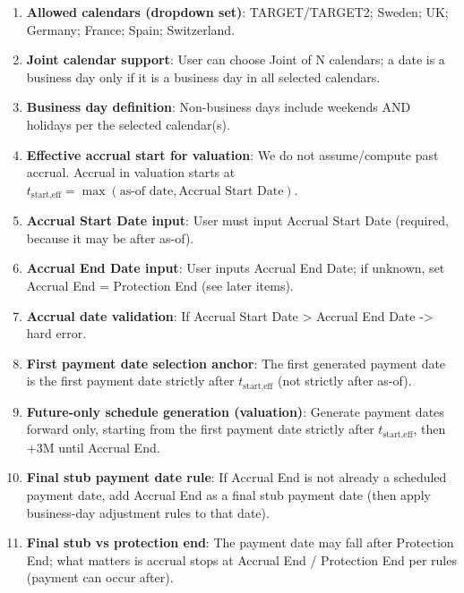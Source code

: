 \documentclass[11pt]{article}
\begin{document}
\begin{enumerate}[label=\arabic*),leftmargin=*,align=left]
\item \textbf{Allowed calendars (dropdown set)}: TARGET/TARGET2; Sweden; UK; Germany; France; Spain; Switzerland.

\item \textbf{Joint calendar support}: User can choose Joint of N calendars; a date is a business day only if it is a business day in all selected calendars.

\item \textbf{Business day definition}: Non-business days include weekends AND holidays per the selected calendar(s).

\item \textbf{Effective accrual start for valuation}: We do not assume/compute past accrual. Accrual in valuation starts at $t_{\text{start,eff}} = \max(\text{as-of date}, \text{Accrual Start Date})$.

\item \textbf{Accrual Start Date input}: User must input Accrual Start Date (required, because it may be after as-of).

\item \textbf{Accrual End Date input}: User inputs Accrual End Date; if unknown, set Accrual End = Protection End (see later items).

\item \textbf{Accrual date validation}: If Accrual Start Date > Accrual End Date -> hard error.

\item \textbf{First payment date selection anchor}: The first generated payment date is the first payment date strictly after $t_{\text{start,eff}}$ (not strictly after as-of).

\item \textbf{Future-only schedule generation (valuation)}: Generate payment dates forward only, starting from the first payment date strictly after $t_{\text{start,eff}}$, then +3M until Accrual End.

\item \textbf{Final stub payment date rule}: If Accrual End is not already a scheduled payment date, add Accrual End as a final stub payment date (then apply business-day adjustment rules to that date).

\item \textbf{Final stub vs protection end}: The payment date may fall after Protection End; what matters is accrual stops at Accrual End / Protection End per rules (payment can occur after).


\end{enumerate}
\end{document}
